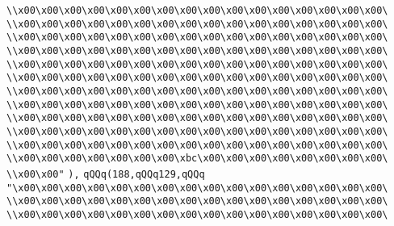 \verb|\\x00\x00\x00\x00\x00\x00\x00\x00\x00\x00\x00\x00\x00\x00\x00\x00\|\newline
\verb|\\x00\x00\x00\x00\x00\x00\x00\x00\x00\x00\x00\x00\x00\x00\x00\x00\|\newline
\verb|\\x00\x00\x00\x00\x00\x00\x00\x00\x00\x00\x00\x00\x00\x00\x00\x00\|\newline
\verb|\\x00\x00\x00\x00\x00\x00\x00\x00\x00\x00\x00\x00\x00\x00\x00\x00\|\newline
\verb|\\x00\x00\x00\x00\x00\x00\x00\x00\x00\x00\x00\x00\x00\x00\x00\x00\|\newline
\verb|\\x00\x00\x00\x00\x00\x00\x00\x00\x00\x00\x00\x00\x00\x00\x00\x00\|\newline
\verb|\\x00\x00\x00\x00\x00\x00\x00\x00\x00\x00\x00\x00\x00\x00\x00\x00\|\newline
\verb|\\x00\x00\x00\x00\x00\x00\x00\x00\x00\x00\x00\x00\x00\x00\x00\x00\|\newline
\verb|\\x00\x00\x00\x00\x00\x00\x00\x00\x00\x00\x00\x00\x00\x00\x00\x00\|\newline
\verb|\\x00\x00\x00\x00\x00\x00\x00\x00\x00\x00\x00\x00\x00\x00\x00\x00\|\newline
\verb|\\x00\x00\x00\x00\x00\x00\x00\x00\x00\x00\x00\x00\x00\x00\x00\x00\|\newline
\verb|\\x00\x00\x00\x00\x00\x00\x00\xbc\x00\x00\x00\x00\x00\x00\x00\x00\|\newline
\verb|\\x00\x00"|\newline
\verb|),|\newline
\verb|qQQq(188,qQQq129,qQQq|\newline
\verb|"\x00\x00\x00\x00\x00\x00\x00\x00\x00\x00\x00\x00\x00\x00\x00\x00\|\newline
\verb|\\x00\x00\x00\x00\x00\x00\x00\x00\x00\x00\x00\x00\x00\x00\x00\x00\|\newline
\verb|\\x00\x00\x00\x00\x00\x00\x00\x00\x00\x00\x00\x00\x00\x00\x00\x00\|\newline
